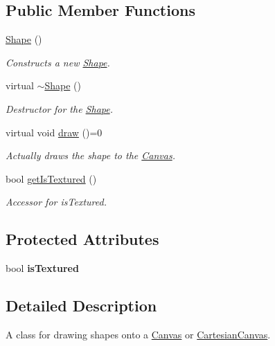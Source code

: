 \subsection*{Public Member Functions}
\begin{DoxyCompactItemize}
\item 
\hyperlink{classtsgl_1_1_shape_ad283a47aa40bf80dcd308cc581c9e2dd}{Shape} ()
\begin{DoxyCompactList}\small\item\em Constructs a new \hyperlink{classtsgl_1_1_shape}{Shape}. \end{DoxyCompactList}\item 
virtual \hyperlink{classtsgl_1_1_shape_aa9bfac883a0748471600fe9752e85948}{$\sim$\+Shape} ()
\begin{DoxyCompactList}\small\item\em Destructor for the \hyperlink{classtsgl_1_1_shape}{Shape}. \end{DoxyCompactList}\item 
virtual void \hyperlink{classtsgl_1_1_shape_af78b1627b97d621824ce86db214e2402}{draw} ()=0
\begin{DoxyCompactList}\small\item\em Actually draws the shape to the \hyperlink{classtsgl_1_1_canvas}{Canvas}. \end{DoxyCompactList}\item 
bool \hyperlink{classtsgl_1_1_shape_aadd0ea81f714328bdf9483851a8b86ad}{get\+Is\+Textured} ()
\begin{DoxyCompactList}\small\item\em Accessor for {\ttfamily is\+Textured}. \end{DoxyCompactList}\end{DoxyCompactItemize}
\subsection*{Protected Attributes}
\begin{DoxyCompactItemize}
\item 
\hypertarget{classtsgl_1_1_shape_a9d5cd6d6a0596a30dbce44eb2d00c583}{}bool {\bfseries is\+Textured}\label{classtsgl_1_1_shape_a9d5cd6d6a0596a30dbce44eb2d00c583}

\end{DoxyCompactItemize}


\subsection{Detailed Description}
A class for drawing shapes onto a \hyperlink{classtsgl_1_1_canvas}{Canvas} or \hyperlink{classtsgl_1_1_cartesian_canvas}{Cartesian\+Canvas}. 

